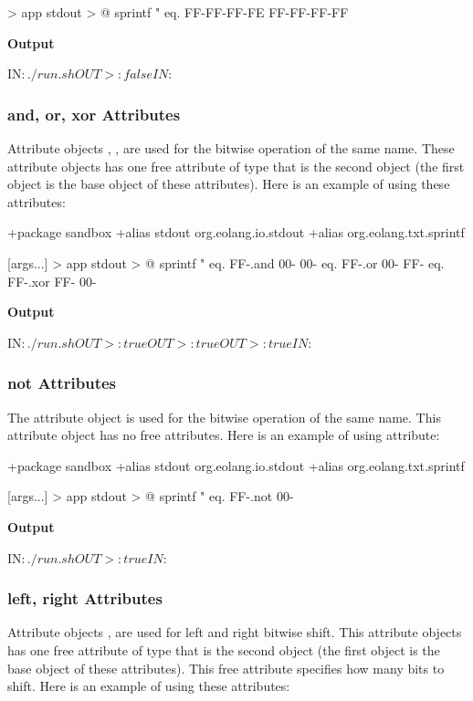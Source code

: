 \documentclass[12pt]{book}
\begin{document}
{\begin{ffcode}
[args...] > app
stdout > @
  sprintf
    "%
    eq.
     FF-FF-FF-FE
     FF-FF-FF-FF
\end{ffcode}
\textbf{Output}
\begin{ffcode}
IN$: ./run.sh
OUT>: false
IN$:
\end{ffcode}

\subsubsection{and, or, xor Attributes}
Attribute objects , ,  are used for the bitwise operation of the same name. These attribute objects has one free attribute of type  that is the second object (the first object is the base object of these attributes). Here is an example of using these attributes:
\begin{ffcode}
+package sandbox
+alias stdout org.eolang.io.stdout
+alias org.eolang.txt.sprintf

[args...] > app
  stdout > @
    sprintf
      "%
      eq.
        FF-.and 00-
        00-
      eq.
        FF-.or 00-
        FF-
      eq.
        FF-.xor FF-
        00-
\end{ffcode}
\textbf{Output}
\begin{ffcode}
IN$: ./run.sh
OUT>: true
OUT>: true
OUT>: true
IN$:
\end{ffcode}

\subsubsection{not Attributes}
The  attribute object is used for the bitwise operation of the same name. This attribute object has no free attributes. Here is an example of using  attribute:
\begin{ffcode}
+package sandbox
+alias stdout org.eolang.io.stdout
+alias org.eolang.txt.sprintf

[args...] > app
  stdout > @
    sprintf
      "%
      eq.
        FF-.not
        00-
\end{ffcode}
\textbf{Output}
\begin{ffcode}
IN$: ./run.sh
OUT>: true
IN$:
\end{ffcode}

\subsubsection{left, right Attributes}
Attribute objects ,  are used for left and right bitwise shift. This attribute objects has one free attribute of type  that is the second object (the first object is the base object of these attributes). This free attribute specifies how many bits to shift. Here is an example of using these attributes:

}
\end{document}
